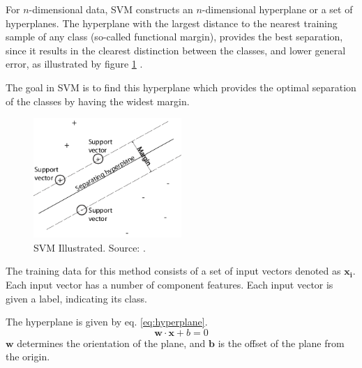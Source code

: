 For \(n\)-dimensional data,
SVM constructs an \(n\)-dimensional hyperplane or a set of hyperplanes.
The hyperplane with the largest distance to the nearest training sample
of any class (so-called functional margin), provides the best separation,
since it results in the clearest distinction between the classes,
and lower general error,
as illustrated by figure \ref{fig::SVM-illustrated} \citep{svmmathworks}.

The goal in SVM is to find this hyperplane which provides the optimal separation 
of the classes by having the widest margin. 

\begin{figure}[h]
\centering
\includegraphics[width = 0.5\textwidth]{img/svmhyperplane}
\caption[SVM Illustrated]{SVM Illustrated. Source: \citep{svmmathworks}.}
\label{fig::SVM-illustrated}
\end{figure}

The training data for this method consists of a set of input vectors denoted as 
$\mathbf{x_i}$.
Each input vector has a number of component features. Each input 
vector is given a label, indicating its class.

The hyperplane is given by eq. \eqref{eq:hyperplane}.
\begin{equation}
\mathbf{w} \cdot \mathbf{x} + b = 0
\label{eq:hyperplane}
\end{equation}
$\mathbf{w}$ determines the orientation of the plane, and 
$\mathbf{b}$ is the offset of the plane from the origin.
 
